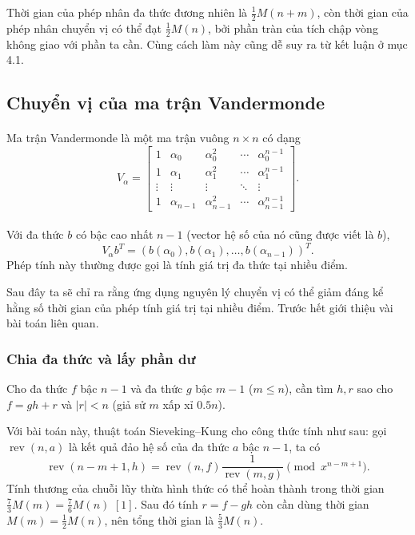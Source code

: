 \documentclass[11pt]{article}
\begin{document}
Thời gian của phép nhân đa thức đương nhiên là
\(\frac12M(n+m)\), còn thời gian của phép nhân chuyển vị có thể đạt
\(\frac12M(n)\), bởi phần tràn của tích chập vòng không giao với phần ta cần.
Cùng cách làm này cũng dễ suy ra từ kết luận ở mục 4.1.

\subsection{Chuyển vị của ma trận Vandermonde}

\paragraph{}
Ma trận Vandermonde là một ma trận vuông \(n\times n\) có dạng
\[
V_\alpha=
\begin{bmatrix}
1 & \alpha_0 & \alpha_0^2 & \cdots & \alpha_0^{n-1}\\
1 & \alpha_1 & \alpha_1^2 & \cdots & \alpha_1^{n-1}\\
\vdots & \vdots & \vdots & \ddots & \vdots\\
1 & \alpha_{n-1} & \alpha_{n-1}^2 & \cdots & \alpha_{n-1}^{n-1}
\end{bmatrix}.
\]

\paragraph{}
Với đa thức \(b\) có bậc cao nhất \(n-1\) (vector hệ số của nó cũng được viết là
\(b\)),
\[
  V_\alpha b^T=(b(\alpha_0),b(\alpha_1),\ldots,b(\alpha_{n-1}))^T.
\]
Phép tính này thường được gọi là tính giá trị đa thức tại nhiều điểm.

Sau đây ta sẽ chỉ ra rằng ứng dụng nguyên lý chuyển vị có thể giảm đáng kể hằng
số thời gian của phép tính giá trị tại nhiều điểm. Trước hết giới thiệu vài bài
toán liên quan.

\subsubsection{Chia đa thức và lấy phần dư}

Cho đa thức \(f\) bậc \(n-1\) và đa thức \(g\) bậc \(m-1\) (\(m\le n\)), cần tìm
\(h,r\) sao cho \(f=gh+r\) và \(|r|<n\) (giả sử \(m\) xấp xỉ \(0.5n\)).

Với bài toán này, thuật toán Sieveking--Kung cho công thức tính như sau: gọi
\(\operatorname{rev}(n,a)\) là kết quả đảo hệ số của đa thức \(a\) bậc
\(n-1\), ta có
\[
  \operatorname{rev}(n-m+1,h)=
  \operatorname{rev}(n,f)\frac{1}{\operatorname{rev}(m,g)}
  \pmod{x^{n-m+1}}.
\]
Tính thương của chuỗi lũy thừa hình thức có thể hoàn thành trong thời gian
\(\frac73M(m)=\frac76M(n)\) \([1]\). Sau đó tính
\(r=f-gh\) còn cần dùng thời gian \(M(m)=\frac12M(n)\), nên tổng thời gian là
\(\frac53M(n)\).
\end{document}
